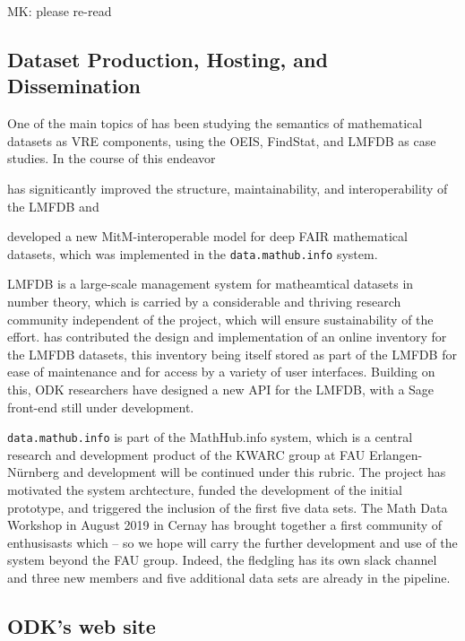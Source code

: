\documentclass{deliverablereport}
\def\dmh{\texttt{data.mathub.info}\xspace}
\begin{document}
\begin{newpart}{MK: please re-read}
\subsection{Dataset Production, Hosting, and Dissemination}

One of the main topics of  has been studying the semantics of mathematical
datasets as VRE components, using the OEIS, FindStat, and LMFDB as case studies. In the
course of this endeavor \pn
\begin{compactenum}
\item has signiticantly improved the structure, maintainability, and interoperability of
  the LMFDB and
\item developed a new MitM-interoperable model for deep FAIR mathematical datasets, which
  was implemented in the \dmh system. 
\end{compactenum}
LMFDB is a large-scale management system for matheamtical datasets in number theory, which
is carried by a considerable and thriving research community independent of the \pn
project, which will ensure sustainability of the effort.
\pn has contributed the design and implementation of an online inventory for the LMFDB datasets, 
this inventory being itself stored as part of the LMFDB for ease of maintenance and for access by a variety of user interfaces.
Building on this, ODK researchers have designed a new API for the LMFDB, with a Sage front-end still under development.




\dmh is part of the MathHub.info system, which is a central research and development
product of the KWARC group at FAU Erlangen-N\"urnberg and development will be continued
under this rubric.
The \pn project has motivated the system archtecture, funded the development of the
initial prototype, and triggered the inclusion of the first five data sets.
The Math Data Workshop in August 2019 in Cernay has brought together a first community of
enthusisasts which -- so we hope will carry the further development and use of the system
beyond the FAU group.
Indeed, the fledgling has its own slack channel and three new members and five additional
data sets are already in the pipeline. 
\end{newpart}

\subsection{ODK's web site}
\end{document}
